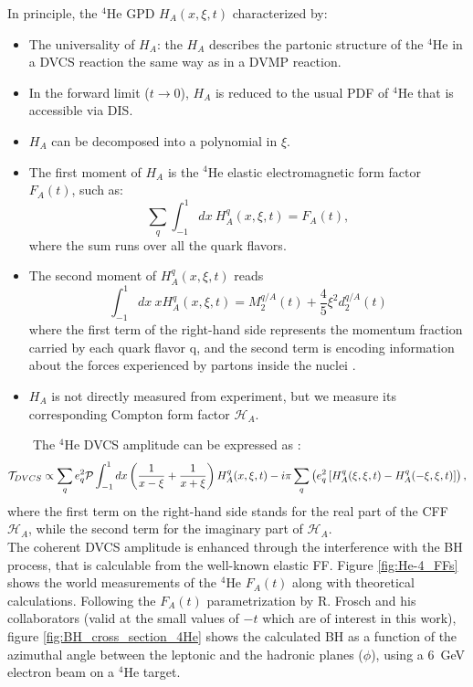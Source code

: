  In principle, the $^4$He GPD $H_{A}(x,\xi,t)$ characterized by:
 \begin{itemize}
 \item The universality of $H_{A}$: the $H_{A}$ describes the partonic structure of the $^4$He in a DVCS reaction the same way as in a DVMP reaction. 
 \item In the forward limit ($t\rightarrow 0$), $H_{A}$ is reduced to the usual PDF of $^4$He that is accessible via DIS.
 \item $H_{A}$ can be decomposed into a polynomial in $\xi$.
 \item The first moment of $H_{A}$ is the $^4$He elastic electromagnetic form factor $F_{A}(t)$, such as:
 \begin{equation}
   \sum_{q} \int_{-1}^{1} dx ~H_{A}^{q}(x, \xi, t) =  F_{A}(t),
\end{equation}
  where the sum runs over all the quark flavors.
  \item The second moment of $H_{A}^{q}(x, \xi, t)$ reads
  \begin{equation}
  \int_{-1}^{1} dx ~x H_{A}^{q}(x, \xi, t) = M ^{q/A}_{2}(t) + \frac{4}{5} \xi^{2} d^{q/A}_{2}(t)
  \end{equation}
    where the first term of the right-hand side represents the momentum fraction carried by each quark flavor q, and the second term is encoding information about the forces experienced by partons inside the nuclei \cite{M_Polyakov}. 
  \item $H_{A}$ is not directly measured from experiment, but we measure its corresponding Compton form factor $\mathcal{H}_{A}$. 
\end{itemize}  
~~~~The $^4$He DVCS amplitude can be expressed as \cite{Kir}:
 \begin{equation}
 \mathcal{T}_{DVCS} \propto \sum_{q} e^{2}_{q} \mathcal{P} \int_{-1}^{1} dx \left(\frac{1}{x-\xi} + \frac{1}{x+\xi} \right) H^{q}_{A}(x,\xi,t) \\- i\pi \sum_{q} \left( e^{2}_{q} \left[ H^{q}_{A}(\xi,\xi,t) - H^{q}_{A}(-\xi,\xi,t) \right] \right),
\end{equation}
 where the first term on the right-hand side stands for the real part of the CFF $\mathcal{H}_{A}$, while the second term for the imaginary part of $\mathcal{H}_{A}$. \\    

The coherent DVCS amplitude is enhanced through the interference with the BH process, that is calculable from the well-known elastic FF. Figure \ref{fig:He-4_FFs} shows the world measurements of the $^4$He $F_{A}(t)$ along with theoretical calculations. Following the $F_{A}(t)$ parametrization by R. Frosch and his collaborators \cite{He_4_FF_Frosch} (valid at the small values of $-t$ which are of interest in this work), figure \ref{fig:BH_cross_section_4He} shows the calculated BH as a function of the azimuthal angle between the leptonic and the hadronic planes ($\phi$), using a 6~GeV electron beam on a $^4$He target.\\

